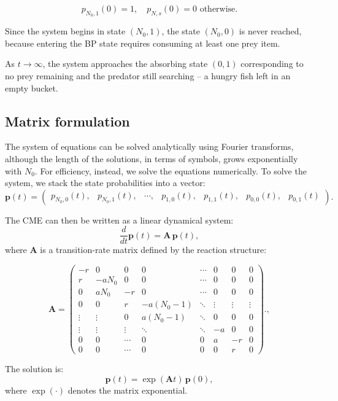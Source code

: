 \[
p_{N_0,1}(0) = 1, \quad p_{N,s}(0) = 0 \text{ otherwise}.
\]

Since the system begins in state $(N_0,1)$, the state $(N_0,0)$ is never reached, because entering the BP state requires consuming at least one prey item.

As $t \to \infty$, the system approaches the absorbing state $(0,1)$ corresponding to no prey remaining and the predator still searching -- a hungry fish left in an empty bucket.

\subsection*{Matrix formulation}
The system of equations can be solved analytically using Fourier transforms, although the length of the solutions, in terms of symbols, grows exponentially with $N_0$. For efficiency, instead, we solve the equations numerically. To solve the system, we stack the state probabilities into a vector:
\begin{equation}
\mathbf{p}(t) =
\begin{pmatrix}
p_{N_0,0}(t), & p_{N_0,1}(t), & \cdots, & p_{1,0}(t), & p_{1,1}(t), & p_{0,0}(t), & p_{0,1}(t)
\end{pmatrix}.
\end{equation}

The CME can then be written as a linear dynamical system:
\[
\frac{d}{dt} \mathbf{p}(t) = \boldsymbol{A} \, \mathbf{p}(t),
\]
where $\boldsymbol{A}$ is a transition-rate matrix defined by the reaction structure:

\begin{equation}
\boldsymbol{A} =
\begin{pmatrix}
-r & 0 & 0 & 0 & \cdots & 0 & 0 & 0\\
r & -aN_0 & 0 & 0 & \cdots & 0 & 0 & 0\\
0 & aN_0 & -r & 0 & \cdots & 0 & 0 & 0\\
0 & 0 & r & -a(N_0-1) & \ddots & \vdots & \vdots & \vdots\\
\vdots & \vdots & 0 & a(N_0-1) & \ddots & 0 & 0 & 0\\
\vdots & \vdots & \vdots & \ddots & \ddots & -a & 0 & 0\\
0 & 0 & \cdots & 0 & 0 & a & -r & 0\\
0 & 0 & \cdots & 0 & 0 & 0 & r & 0
\end{pmatrix}.,
\end{equation}

The solution is:
\[
\mathbf{p}(t) = \exp(\boldsymbol{A} t)\, \mathbf{p}(0),
\]
where $\exp(\cdot)$ denotes the matrix exponential.

